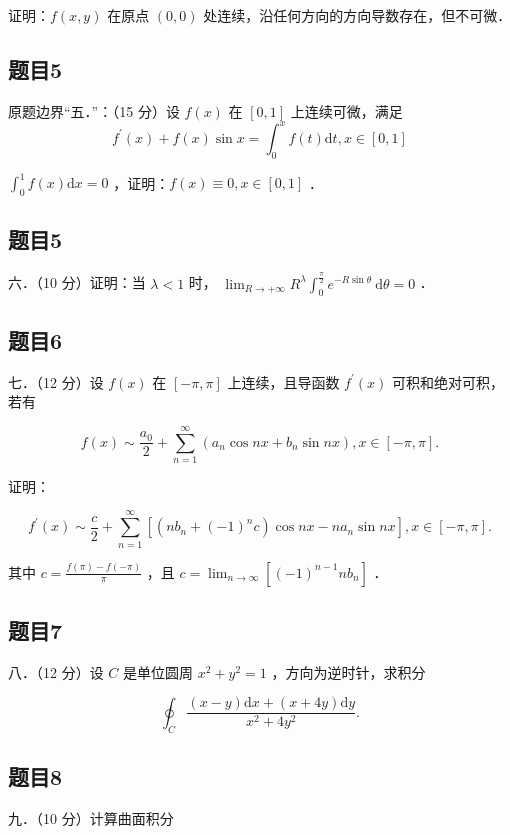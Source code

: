 \documentclass{article}
\begin{document}
证明：\(f(x, y)\) 在原点 \((0,0)\) 处连续，沿任何方向的方向导数存在，但不可微．

\begin{itemize}
\end{itemize}

\subsection{题目5}
原题边界“五．”：（15 分）设 \(f(x)\) 在 \([0,1]\) 上连续可微，满足
\[
f^{\prime}(x)+f(x) \sin x=\int_{0}^{x} f(t) \mathrm{d} t, x \in[0,1]
\]
  \item[且] \(\int_{0}^{1} f(x) \mathrm{d} x=0\) ，证明：\(f(x) \equiv 0, x \in[0,1]\) ．

\subsection{题目5}
六．（10 分）证明：当 \(\lambda<1\) 时， \(\lim _{R \rightarrow+\infty} R^{\lambda} \int_{0}^{\frac{\pi}{2}} e^{-R \sin \theta} \mathrm{~d} \theta=0\) ．

\subsection{题目6}
七．（12 分）设 \(f(x)\) 在 \([-\pi, \pi]\) 上连续，且导函数 \(f^{\prime}(x)\) 可积和绝对可积，若有

\[
f(x) \sim \frac{a_{0}}{2}+\sum_{n=1}^{\infty}\left(a_{n} \cos n x+b_{n} \sin n x\right), x \in[-\pi, \pi] .
\]

证明：

\[
f^{\prime}(x) \sim \frac{c}{2}+\sum_{n=1}^{\infty}\left[\left(n b_{n}+(-1)^{n} c\right) \cos n x-n a_{n} \sin n x\right], x \in[-\pi, \pi] .
\]

其中 \(c=\frac{f(\pi)-f(-\pi)}{\pi}\) ，且 \(c=\lim _{n \rightarrow \infty}\left[(-1)^{n-1} n b_{n}\right]\) ．

\subsection{题目7}
八．（12 分）设 \(C\) 是单位圆周 \(x^{2}+y^{2}=1\) ，方向为逆时针，求积分

\[
\oint_{C} \frac{(x-y) \mathrm{d} x+(x+4 y) \mathrm{d} y}{x^{2}+4 y^{2}} .
\]

\subsection{题目8}
九．（10 分）计算曲面积分
\end{document}
